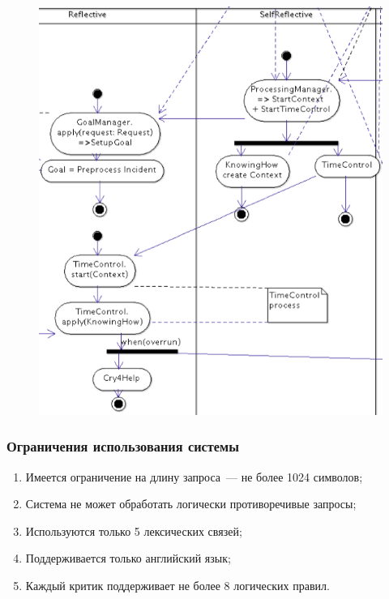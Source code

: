 \documentclass[14pt]{beamer}
\begin{document}
\begin{frame}
\begin{figure} [h]
\begin{minipage}{150pt}
  	 \includegraphics [scale=0.3] {LifecycleShortcut}
  \end{minipage}
  \label{img:LifecycleActivity}  
\end{figure}


\end{frame}

\begin{frame}
\frametitle{Ограничения использования системы}
\begin{enumerate}
	\item Имеется ограничение на длину запроса~--- не более 1024 символов;
	\item Система не может обработать логически противоречивые запросы;
	\item Используются только 5 лексических связей;
	\item Поддерживается только английский язык;
	\item Каждый критик поддерживает не более 8 логических правил.

\end{enumerate}
\end{frame}
\end{document}
